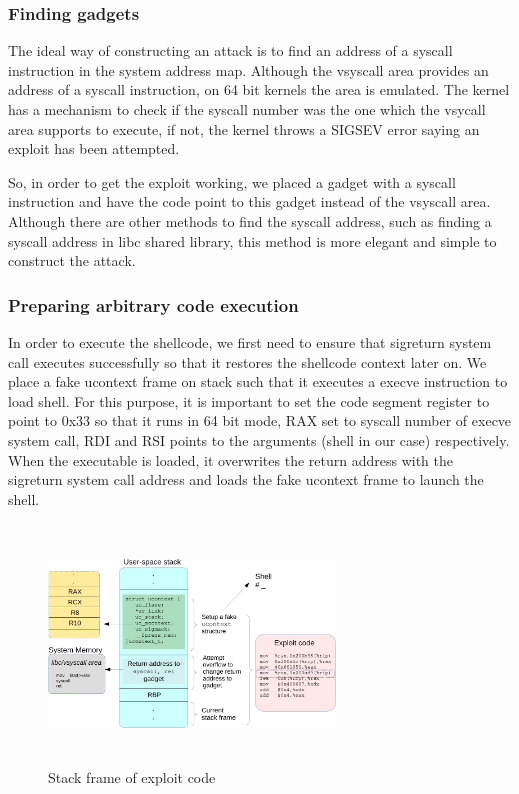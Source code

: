 \documentclass{sig-alternate-05-2015}
\begin{document}
\subsubsection{Finding gadgets}
\par The ideal way of constructing an attack is to find an address of a
syscall instruction in the system address map. Although the vsyscall area provides 
an address of a syscall instruction, on 64 bit kernels the area is emulated. 
The kernel has a mechanism to check if the syscall number was the one which the 
vsycall area supports to execute, if not, the kernel throws a SIGSEV error 
saying an exploit has been attempted.  
\par So, in order to get the exploit working, we placed a gadget with a syscall 
instruction and have the code point to this gadget instead of the vsyscall area.
Although there are other methods to find the syscall address, such as finding a 
syscall address in libc shared library, this method is more elegant and simple to 
construct the attack.

\subsubsection{Preparing arbitrary code execution}
In order to execute the shellcode, we first need to ensure that sigreturn system
call executes successfully so that it restores the shellcode context later on. We
place a fake ucontext frame on stack such that it executes a execve instruction to
load shell. For this purpose, it is important to set the code segment register to 
point to 0x33 so that it runs in 64 bit mode, RAX set to syscall number of execve
system call, RDI and RSI points to the arguments (shell in our case) respectively.
When the executable is loaded, it overwrites the return address with the sigreturn
system call address and loads the fake ucontext frame to launch the shell.

\begin{figure}
\centering
\includegraphics[height=2.5in, width=3in]{5.pdf}
\caption{Stack frame of exploit code}
\label{fig:SFEC}
\end{figure}
\end{document}
